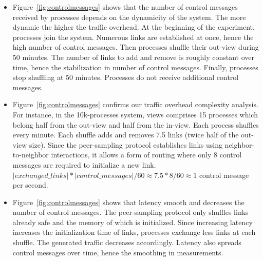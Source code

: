 \begin{itemize}[leftmargin=*]
\item Figure~\ref{fig:controlmessages} shows that the number of control messages
  received by processes depends on the dynamicity of the system. The more
  dynamic the higher the traffic overhead. At the beginning of the experiment,
  processes join the system. Numerous links are established at once, hence the
  high number of control messages. Then processes shuffle their out-view during
  50 minutes. The number of links to add and remove is roughly constant over
  time, hence the stabilization in number of control messages. Finally,
  processes stop shuffling at $50$ minutes. Processes do not receive additional
  control messages.
\item Figure~\ref{fig:controlmessages} confirms our traffic overhead complexity
  analysis. For instance, in the 10k-processes system, views comprises 15
  processes which belong half from the out-view and half from the in-view.  Each
  process shuffles every minute. Each shuffle adds and removes 7.5 links (twice
  half of the out-view size). Since the peer-sampling protocol establishes links
  using neighbor-to-neighbor interactions, it allows a form of routing where
  only 8 control messages are required to initialize a new link.
  $|exchanged\_links|*|control\_messages|/60 \approx 7.5*8/60 \approx 1$ control
  message per second.
\item Figure~\ref{fig:controlmessages} shows that latency smooth and decreases
  the number of control messages. The peer-sampling protocol only shuffles links
  already safe and the memory of which is initialized. Since increasing latency
  increases the initialization time of links, processes exchange less links at
  each shuffle. The generated traffic decreases accordingly. Latency also
  spreads control messages over time, hence the smoothing in measurements.
\end{itemize}


